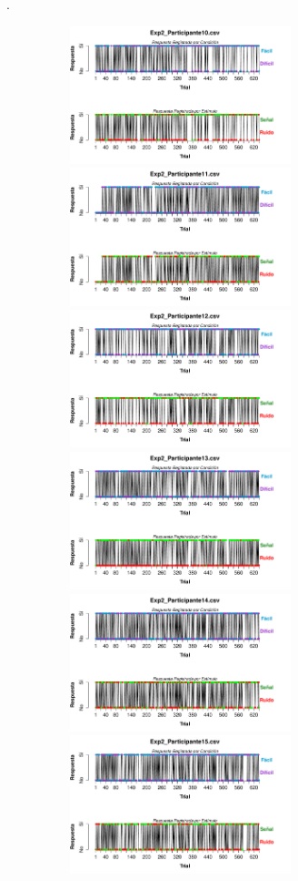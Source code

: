 \documentclass[a4paper ]{article}
\begin{document}
\vfill .
\begin{figure}[th]
\begin{center}
\includegraphics[width=8cm, height=4cm]{Figures/BiasResp_Exp2_P10} \includegraphics[width=8cm, height=4cm]{Figures/BiasResp_Exp2_P11} \includegraphics[width=8cm, height=4cm]{Figures/BiasResp_Exp2_P12}
\includegraphics[width=8cm, height=4cm]{Figures/BiasResp_Exp2_P13} \includegraphics[width=8cm, height=4cm]{Figures/BiasResp_Exp2_P14} \includegraphics[width=8cm, height=4cm]{Figures/BiasResp_Exp2_P15}

\end{center}
\end{figure}
\end{document}
